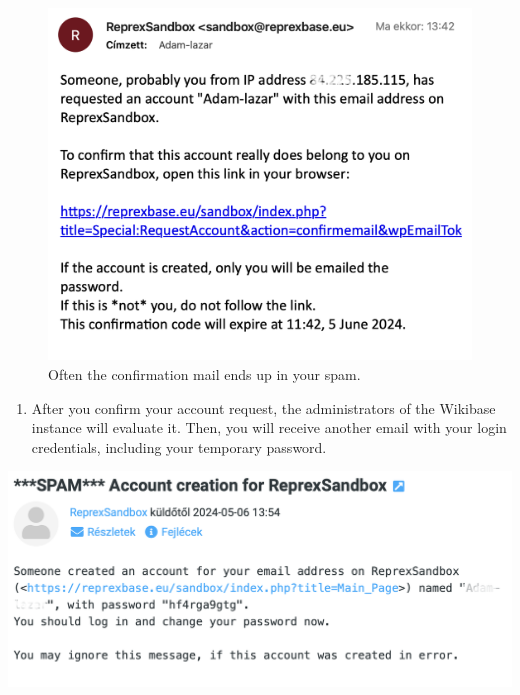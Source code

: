 \documentclass[
  letterpaper,
  DIV=11,
  numbers=noendperiod]{scrreprt}
\providecommand{\tightlist}{%
  \setlength{\itemsep}{0pt}\setlength{\parskip}{0pt}}\usepackage{longtable,booktabs,array}
\begin{document}
\begin{figure}[H]

{\centering \includegraphics{png/wikibase/request-account_confirmation-email.png}

}

\caption{Often the confirmation mail ends up in your spam.}

\end{figure}%

\begin{enumerate}
\def\labelenumi{\arabic{enumi}.}
\setcounter{enumi}{4}
\tightlist
\item
  After you confirm your account request, the administrators of the
  Wikibase instance will evaluate it. Then, you will receive another
  email with your login credentials, including your temporary password.
\end{enumerate}

\includegraphics{png/wikibase/request-account_email-with-temporary-login-credentials.png}
\end{document}
